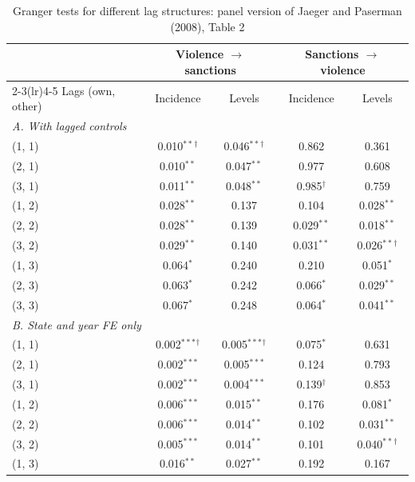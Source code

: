 \begin{table}[htbp]
\centering
\footnotesize
\caption{Granger tests for different lag structures: panel version of Jaeger and Paserman (2008), Table 2}
\label{tab:laggrid}
\begin{threeparttable}
\begin{tabular}{lcccc}
\toprule
 & \multicolumn{2}{c}{Violence $\rightarrow$ sanctions} & \multicolumn{2}{c}{Sanctions $\rightarrow$ violence} \\
\cmidrule(lr){2-3}\cmidrule(lr){4-5}
Lags (own, other) & Incidence & Levels & Incidence & Levels \\
\midrule
\multicolumn{5}{l}{\textit{A. With lagged controls}} \\
\quad (1, 1) & 0.010$^{**}$$^{\dagger}$ & 0.046$^{**}$$^{\dagger}$ & 0.862 & 0.361 \\
\quad (2, 1) & 0.010$^{**}$ & 0.047$^{**}$ & 0.977 & 0.608 \\
\quad (3, 1) & 0.011$^{**}$ & 0.048$^{**}$ & 0.985$^{\dagger}$ & 0.759 \\
\quad (1, 2) & 0.028$^{**}$ & 0.137 & 0.104 & 0.028$^{**}$ \\
\quad (2, 2) & 0.028$^{**}$ & 0.139 & 0.029$^{**}$ & 0.018$^{**}$ \\
\quad (3, 2) & 0.029$^{**}$ & 0.140 & 0.031$^{**}$ & 0.026$^{**}$$^{\dagger}$ \\
\quad (1, 3) & 0.064$^{*}$ & 0.240 & 0.210 & 0.051$^{*}$ \\
\quad (2, 3) & 0.063$^{*}$ & 0.242 & 0.066$^{*}$ & 0.029$^{**}$ \\
\quad (3, 3) & 0.067$^{*}$ & 0.248 & 0.064$^{*}$ & 0.041$^{**}$ \\
\midrule
\multicolumn{5}{l}{\textit{B. State and year FE only}} \\
\quad (1, 1) & 0.002$^{***}$$^{\dagger}$ & 0.005$^{***}$$^{\dagger}$ & 0.075$^{*}$ & 0.631 \\
\quad (2, 1) & 0.002$^{***}$ & 0.005$^{***}$ & 0.124 & 0.793 \\
\quad (3, 1) & 0.002$^{***}$ & 0.004$^{***}$ & 0.139$^{\dagger}$ & 0.853 \\
\quad (1, 2) & 0.006$^{***}$ & 0.015$^{**}$ & 0.176 & 0.081$^{*}$ \\
\quad (2, 2) & 0.006$^{***}$ & 0.014$^{**}$ & 0.102 & 0.031$^{**}$ \\
\quad (3, 2) & 0.005$^{***}$ & 0.014$^{**}$ & 0.101 & 0.040$^{**}$$^{\dagger}$ \\
\quad (1, 3) & 0.016$^{**}$ & 0.027$^{**}$ & 0.192 & 0.167 \\

\end{tabular}
\end{threeparttable}
\end{table}
